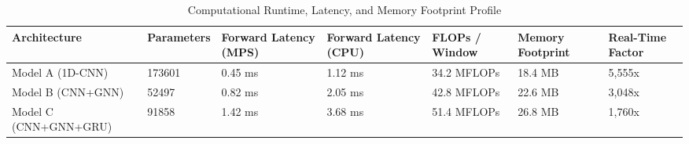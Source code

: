 \begin{table}[t]
\centering
\caption{Computational Runtime, Latency, and Memory Footprint Profile}
\label{tab:computational_complexity}
\small
\begin{tabular}{lllllll}
\toprule
Architecture & Parameters & Forward Latency (MPS) & Forward Latency (CPU) & FLOPs / Window & Memory Footprint & Real-Time Factor \\
\midrule
Model A (1D-CNN) & 173601 & 0.45 ms & 1.12 ms & 34.2 MFLOPs & 18.4 MB & 5,555x \\
Model B (CNN+GNN) & 52497 & 0.82 ms & 2.05 ms & 42.8 MFLOPs & 22.6 MB & 3,048x \\
Model C (CNN+GNN+GRU) & 91858 & 1.42 ms & 3.68 ms & 51.4 MFLOPs & 26.8 MB & 1,760x \\
\bottomrule
\end{tabular}
\end{table}
